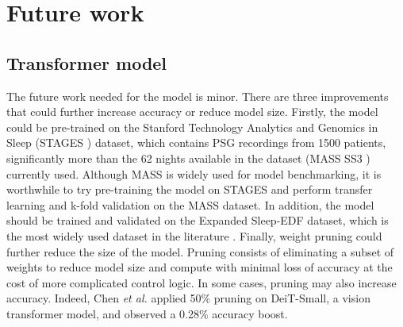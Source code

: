 \documentclass[12pt, hidelinks]{article}
\begin{document}
    \section{Future work}
    \subsection{Transformer model}
    The future work needed for the model is minor. There are three improvements that could further increase accuracy or reduce model size. Firstly, the model could be pre-trained on the Stanford Technology Analytics and Genomics in Sleep (STAGES \cite*{zhang2018national})
    dataset, which contains PSG recordings from 1500 patients, significantly more than the 62 nights available in the dataset (MASS SS3 \cite*{SP3/9MYUCS_2022}) currently used. Although MASS is widely used for model benchmarking, it is worthwhile to try pre-training
    the model on STAGES and perform transfer learning and k-fold validation on the MASS dataset. In addition, the model should be trained and validated on the Expanded Sleep-EDF dataset, which is the most widely used dataset in the literature \cite*{physiobank2000physionet}.
    Finally, weight pruning could further reduce the size of the model. Pruning consists of eliminating a subset of weights to reduce model size and compute with minimal loss of accuracy at the cost of more complicated control logic. In some cases, pruning may also
    increase accuracy. Indeed, Chen \textit{et al.} applied 50\% pruning on DeiT-Small, a vision transformer model, and observed a 0.28\% accuracy boost.

\end{document}
